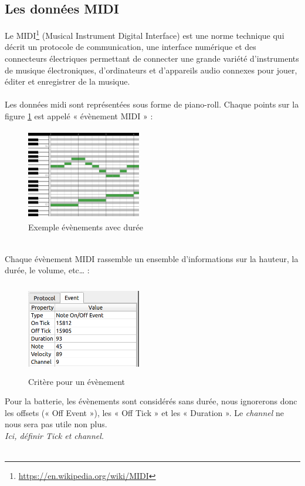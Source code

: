\subsection*{Les données MIDI}
Le MIDI\footnote{\url{https://en.wikipedia.org/wiki/MIDI}} (Musical Instrument Digital Interface) est une norme technique qui décrit un protocole de communication, une interface numérique et des connecteurs électriques permettant de connecter une grande variété d'instruments de musique électroniques, d'ordinateurs et d'appareils audio connexes pour jouer, éditer et enregistrer de la musique.\\\\
Les données midi sont représentées sous forme de piano-roll. Chaque points sur la figure \ref{piano_roll} est appelé « évènement MIDI » :
\begin{figure}[!h]
	\centering
	\includegraphics[height=40mm, width=50mm]{z_images/1_contexte/2_midi_piano.jpg}
	\caption{Exemple évènements avec durée}
	\label{piano_roll}
\end{figure}\\
Chaque évènement MIDI rassemble un ensemble d’informations sur la hauteur, la durée, le volume, etc… :
\begin{figure}[h!]
	\centering
	\includegraphics[height=40mm, width=50mm]{z_images/1_contexte/3_evenements_midi.png}
	\caption{Critère pour un évènement}
\end{figure}\newpage
Pour la batterie, les évènements sont considérés sans durée, nous ignorerons donc les offsets (« Off Event »), les « Off Tick » et les « Duration ». Le \textit{channel} ne nous sera pas utile non plus.\\
\textit{Ici, définir Tick et channel.}\\\\
